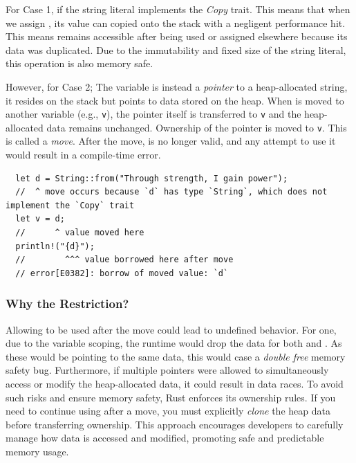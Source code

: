 \documentclass[11pt]{report}
\theoremstyle{definition}
\theoremstyle{plain}
\begin{document}
For Case 1, if the string literal  implements the \textit{Copy} trait. This means that when we assign , its value can copied onto the stack with a negligent performance hit. This means  remains accessible after being used or assigned elsewhere because its data was duplicated. Due to the immutability and fixed size of the string literal, this operation is also memory safe.

However, for Case 2; The variable  is instead a \textit{pointer} to a heap-allocated string, it resides on the stack but points to data stored on the heap. When  is moved to another variable (e.g., \texttt{v}), the pointer itself is transferred to \texttt{v} and the heap-allocated data remains unchanged. Ownership of the pointer is moved to \texttt{v}. This is called a \textit{move}. After the move,  is no longer valid, and any attempt to use it would result in a compile-time error.
\begin{verbatim}
  let d = String::from("Through strength, I gain power");
  //  ^ move occurs because `d` has type `String`, which does not implement the `Copy` trait
  let v = d;
  //      ^ value moved here
  println!("{d}"); 
  //        ^^^ value borrowed here after move
  // error[E0382]: borrow of moved value: `d`
\end{verbatim}

\subsubsection{Why the Restriction?}

Allowing  to be used after the move could lead to undefined behavior. For one, due to the variable scoping, the runtime would drop the data for both  and . As these would be pointing to the same data, this would case a \textit{double free} memory safety bug. Furthermore, if multiple pointers were allowed to simultaneously access or modify the heap-allocated data, it could result in data races. To avoid such risks and ensure memory safety, Rust enforces its ownership rules. If you need to continue using  after a move, you must explicitly \textit{clone} the heap data before transferring ownership. This approach encourages developers to carefully manage how data is accessed and modified, promoting safe and predictable memory usage.
\end{document}
